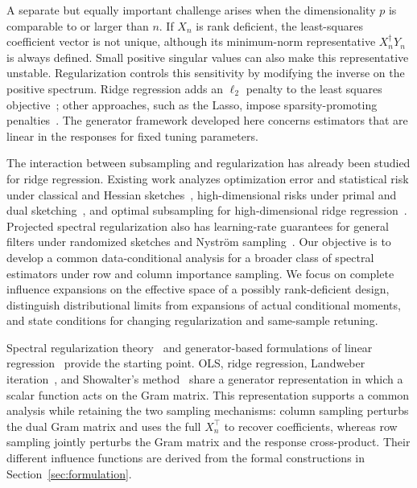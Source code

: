 \documentclass[pdflatex,iicol,sn-mathphys-ay]{sn-jnl}
\theoremstyle{thmstyleone}
\theoremstyle{thmstylethree}
\theoremstyle{thmstyletwo}
\begin{document}
A separate but equally important challenge arises when the dimensionality $p$ is comparable to or larger than $n$. If $X_n$ is rank deficient, the least-squares coefficient vector is not unique, although its minimum-norm representative $X_n^\dagger Y_n$ is always defined. Small positive singular values can also make this representative unstable. Regularization controls this sensitivity by modifying the inverse on the positive spectrum. Ridge regression adds an $\ell_2$ penalty to the least squares objective~\citep{hoerl1970ridge}; other approaches, such as the Lasso, impose sparsity-promoting penalties~\citep{tibshirani1996lasso}. The generator framework developed here concerns estimators that are linear in the responses for fixed tuning parameters.

The interaction between subsampling and regularization has already been studied for ridge regression. Existing work analyzes optimization error and statistical risk under classical and Hessian sketches~\citep{wang2018sketched}, high-dimensional risks under primal and dual sketching~\citep{liu2020ridge}, and optimal subsampling for high-dimensional ridge regression~\citep{li2024optimal}. Projected spectral regularization also has learning-rate guarantees for general filters under randomized sketches and Nystr\"om sampling~\citep{lin2020convergences}. Our objective is to develop a common data-conditional analysis for a broader class of spectral estimators under row and column importance sampling. We focus on complete influence expansions on the effective space of a possibly rank-deficient design, distinguish distributional limits from expansions of actual conditional moments, and state conditions for changing regularization and same-sample retuning.

Spectral regularization theory~\citep{engl1996regularization} and generator-based
formulations of linear regression~\citep{wang2024linear} provide the starting
point. OLS, ridge regression, Landweber iteration~\citep{landweber1951iteration},
and Showalter's method~\citep{showalter1967representation} share a generator
representation in which a scalar function acts on the Gram matrix. This
representation supports a common analysis while retaining the two sampling
mechanisms: column sampling perturbs the dual Gram matrix and uses the full
$X_n^\top$ to recover coefficients, whereas row sampling jointly perturbs the
Gram matrix and the response cross-product. Their different influence
functions are derived from the formal constructions in
Section~\ref{sec:formulation}.
\end{document}
